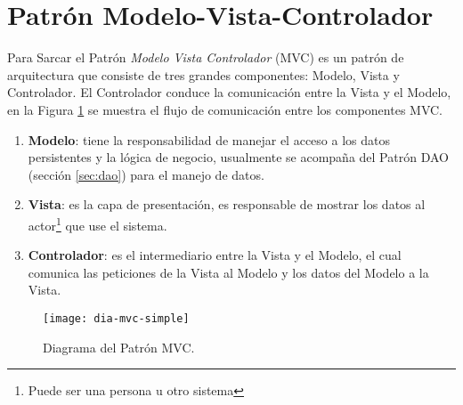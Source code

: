 \section{Patrón Modelo-Vista-Controlador}\label{sec:mvc}
Para Sarcar\cite{JavaDesignPatternsExamples} el Patrón \textit{Modelo Vista Controlador} (MVC) es un patrón de arquitectura que consiste de tres grandes componentes: Modelo, Vista y Controlador. El Controlador conduce la comunicación entre la Vista y el Modelo, en la Figura \ref{fig:dia-mvc-simple} se muestra el flujo de comunicación entre los componentes MVC.
\begin{enumerate}
	\item \textbf{Modelo}: tiene la responsabilidad de manejar el acceso a los datos persistentes y la lógica de negocio, usualmente se acompaña del Patrón DAO (sección \ref{sec:dao}) para el manejo de datos.
	\item \textbf{Vista}: es la capa de presentación, es responsable de mostrar los datos al actor\footnote{Puede ser una persona u otro sistema} que use el sistema.
	\item \textbf{Controlador}: es el intermediario entre la Vista y el Modelo, el cual comunica las peticiones de la Vista al Modelo y los datos del Modelo a la Vista.
\end{enumerate}
\begin{figure}[h]
  \centering
  \texttt{[image: dia-mvc-simple]}
  \caption{Diagrama del Patrón MVC\cite{JavaDesignPatternsExamples}.}
  \label{fig:dia-mvc-simple}
\end{figure}

